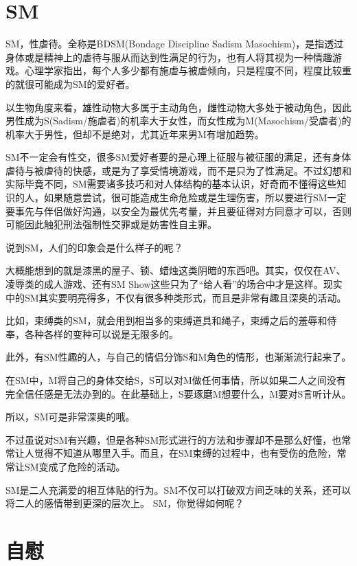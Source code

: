 \documentclass[12pt,UTF8]{ctexbook}
\begin{document}
\chapter{SM}

SM，性虐待。全称是BDSM(Bondage Discipline Sadism Masochism)，是指透过身体或是精神上的虐待与服从而达到性满足的行为，也有人将其视为一种情趣游戏。心理学家指出，每个人多少都有施虐与被虐倾向，只是程度不同，程度比较重的就很可能成为SM的爱好者。

以生物角度来看，雄性动物大多属于主动角色，雌性动物大多处于被动角色，因此男性成为S(Sadism/施虐者)的机率大于女性，而女性成为M(Masochism/受虐者)的机率大于男性，但却不是绝对，尤其近年来男M有增加趋势。

SM不一定会有性交，很多SM爱好者要的是心理上征服与被征服的满足，还有身体虐待与被虐待的快感，或是为了享受情境游戏，而不是只为了性满足。不过幻想和实际毕竟不同，SM需要诸多技巧和对人体结构的基本认识，好奇而不懂得这些知识的人，如果随意尝试，很可能造成生命危险或是生理伤害，所以要进行SM一定要事先与伴侣做好沟通，以安全为最优先考量，并且要征得对方同意才可以，否则可能因此触犯刑法强制性交罪或是妨害性自主罪。

说到SM，人们的印象会是什么样子的呢？

大概能想到的就是漆黑的屋子、锁、蜡烛这类阴暗的东西吧。其实，仅仅在AV、凌辱类的成人游戏、还有SM Show这些只为了“给人看”的场合中才是这样。现实中的SM其实要明亮得多，不仅有很多种类形式，而且是非常有趣且深奥的活动。

比如，束缚类的SM，就会用到相当多的束缚道具和绳子，束缚之后的羞辱和侍奉，各种各样的变种可以说是无限多的。

此外，有SM性趣的人，与自己的情侣分饰S和M角色的情形，也渐渐流行起来了。

在SM中，M将自己的身体交给S，S可以对M做任何事情，所以如果二人之间没有完全信任感是无法办到的。在此基础上，S要琢磨M想要什么，M要对S言听计从。

所以，SM可是非常深奥的哦。

不过虽说对SM有兴趣，但是各种SM形式进行的方法和步骤却不是那么好懂，也常常让人觉得不知道从哪里入手。而且，在SM束缚的过程中，也有受伤的危险，常常让SM变成了危险的活动。

SM是二人充满爱的相互体贴的行为。SM不仅可以打破双方间乏味的关系，还可以将二人的感情带到更深的层次上。
SM，你觉得如何呢？



\chapter{自慰}
\end{document}
